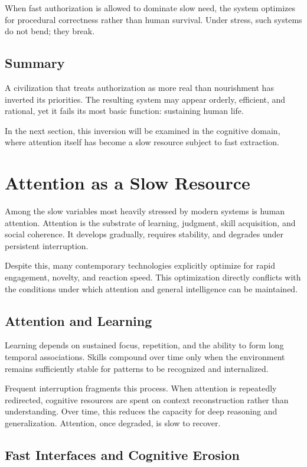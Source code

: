 \documentclass[12pt]{article} \usepackage[margin=1in]{geometry} \usepackage{setspace} \usepackage{amsmath,amssymb} \usepackage{hyperref}
\begin{document}
When fast authorization is allowed to dominate slow need, the system optimizes for procedural correctness rather than human survival. Under stress, such systems do not bend; they break.

\subsection{Summary}

A civilization that treats authorization as more real than nourishment has inverted its priorities. The resulting system may appear orderly, efficient, and rational, yet it fails its most basic function: sustaining human life.

In the next section, this inversion will be examined in the cognitive domain, where attention itself has become a slow resource subject to fast extraction.

\section{Attention as a Slow Resource}

Among the slow variables most heavily stressed by modern systems is human attention. Attention is the substrate of learning, judgment, skill acquisition, and social coherence. It develops gradually, requires stability, and degrades under persistent interruption.

Despite this, many contemporary technologies explicitly optimize for rapid engagement, novelty, and reaction speed. This optimization directly conflicts with the conditions under which attention and general intelligence can be maintained.

\subsection{Attention and Learning}

Learning depends on sustained focus, repetition, and the ability to form long temporal associations. Skills compound over time only when the environment remains sufficiently stable for patterns to be recognized and internalized.

Frequent interruption fragments this process. When attention is repeatedly redirected, cognitive resources are spent on context reconstruction rather than understanding. Over time, this reduces the capacity for deep reasoning and generalization. Attention, once degraded, is slow to recover.

\subsection{Fast Interfaces and Cognitive Erosion}
\end{document}
